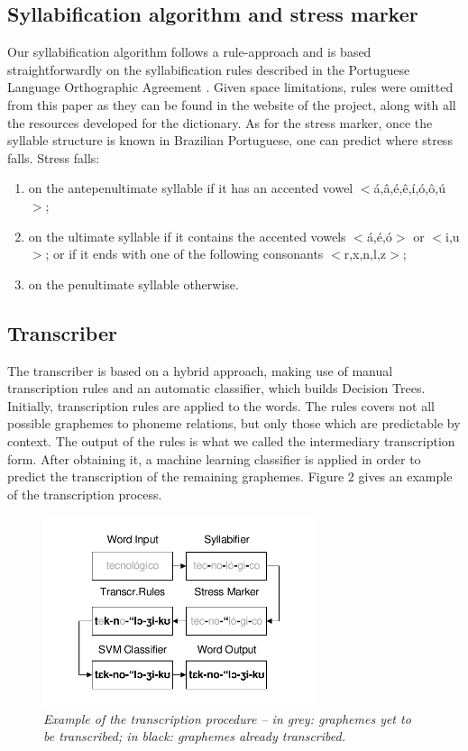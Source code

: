 \subsection{Syllabification algorithm and stress marker}

Our syllabification algorithm follows a rule-approach and is based straightforwardly on the syllabification
rules described in the Portuguese Language Orthographic Agreement \cite{Acordo2009}. Given space limitations,
rules were omitted from this paper as they can be found in the website of the project, along with all the
resources developed for the dictionary. As for the stress marker, once the syllable structure is known
in Brazilian Portuguese, one can predict where stress falls. Stress falls:

\begin{enumerate}
 \item on the antepenultimate syllable if it has an accented vowel $<$\'a,\^a,\'e,\^e,\'i,\'o,\^o,\'u$>$;
 \item on the ultimate syllable if it contains the accented vowels $<$\'a,\'e,\'o$>$ or $<$i,u$>$; or if it ends with one of the following consonants $<$r,x,n,l,z$>$;
 \item on the penultimate syllable otherwise.
\end{enumerate}


\subsection{Transcriber}
The transcriber is based on a hybrid approach, making use of manual transcription rules and an automatic classifier, 
which builds Decision Trees. Initially, transcription rules are applied to the words. 
The rules covers not all possible graphemes
to phoneme relations, but only those which are predictable by context. The output of the rules is what we called the 
intermediary transcription form. After obtaining it, a machine learning classifier is applied in order to
predict the transcription of the remaining graphemes. Figure 2 gives an example of the transcription process.

\begin{figure}[!ht]
\centerline{ \includegraphics[width=8cm]{./gfx/aeiouado-transcript-ex.pdf}}
\caption{{\it Example of the transcription procedure -- in grey: graphemes yet to be transcribed; in black: graphemes already transcribed.}}
\label{transcExample}
\end{figure}

